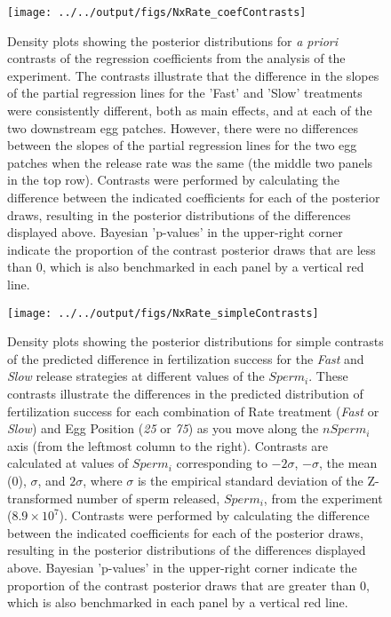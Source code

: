 \documentclass{article}
\begin{document}
\begin{figure}[!ht]
\texttt{[image: ../../output/figs/NxRate\_coefContrasts]}
\caption{Density plots showing the posterior distributions for \textit{a priori} contrasts of the regression coefficients from the analysis of the  experiment. The contrasts illustrate that the difference in the slopes of the partial regression lines for the 'Fast' and 'Slow' treatments were consistently different, both as main effects, and at each of the two downstream egg patches. However, there were no differences between the slopes of the partial regression lines for the two egg patches when the release rate was the same (the middle two panels in the top row). Contrasts were performed by calculating the difference between the indicated coefficients for each of the posterior draws, resulting in the posterior distributions of the differences displayed above. Bayesian 'p-values' in the upper-right corner indicate the proportion of the contrast posterior draws that are less than $0$, which is also benchmarked in each panel by a vertical red line.}
\label{fig:coefContr}
\end{figure}
\newpage{}



\begin{figure}[!ht]
\texttt{[image: ../../output/figs/NxRate\_simpleContrasts]}
\caption{Density plots showing the posterior distributions for simple contrasts of the predicted difference in fertilization success for the \textit{Fast} and \textit{Slow} release strategies at different values of the $Sperm_i$. These contrasts illustrate the differences in the predicted distribution of fertilization success for each combination of Rate treatment (\textit{Fast} or \textit{Slow}) and Egg Position (\textit{25} or \textit{75}) as you move along the $nSperm_i$ axis (from the leftmost column to the right). Contrasts are calculated at values of $Sperm_i$ corresponding to $-2 \sigma$, $-\sigma$, the mean ($0$), $\sigma$, and $2 \sigma$, where $\sigma$ is the empirical standard deviation of the Z-transformed number of sperm released, $Sperm_i$, from the  experiment ($8.9 \times 10^{7}$). Contrasts were performed by calculating the difference between the indicated coefficients for each of the posterior draws, resulting in the posterior distributions of the differences displayed above. Bayesian 'p-values' in the upper-right corner indicate the proportion of the contrast posterior draws that are greater than $0$, which is also benchmarked in each panel by a vertical red line.}
\label{fig:simpContr}
\end{figure}
\newpage{}
\end{document}
